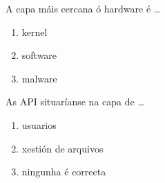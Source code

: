 \begin{diapo} \begin{frame}{ A capa máis cercana ó hardware é  \dots} 
\begin{enumerate}
	\item kernel\pause
	\item software \pause
	\item malware 
\end{enumerate} \end{frame}  \end{diapo}  
\begin{diapo}\begin{frame}{ As API situaríanse na capa de   \dots}
\begin{enumerate}
	\item usuarios \pause
	\item xestión de arquivos \pause
	\item ningunha é correcta 
\end{enumerate} \end{frame} \end{diapo}

